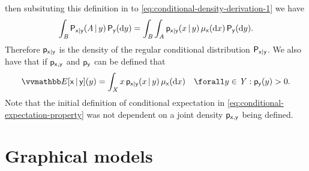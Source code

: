 then subsituting this definition in to \eqref{eq:conditional-density-derivation-1} we have
\begin{equation}\label{eq:conditional-density-derivation-2}
  \int_{\mathit{B}} \mathsf{P}_{\mathsf{x}|\mathsf{y}}(\mathit{A}\operatorname{|} y) \,\mathsf{P}_{\mathsf{y}}(\mathrm{d} y)
  =
  \int_{\mathit{B}}\int_{\mathit{A}} 
    \mathsf{p}_{\mathsf{x}|\mathsf{y}}(x\operatorname{|} y)
  \,\mu_{\mathsf{x}}(\mathrm{d} x)\,\mathsf{P}_{\mathsf{y}}(\mathrm{d} y).
\end{equation}
Therefore $\mathsf{p}_{\mathsf{x}|\mathsf{y}}$ is the density of the regular conditional distribution $\mathsf{P}_{\mathsf{x}|\mathsf{y}}$. We also have that if $\mathsf{p}_{\mathsf{x},\mathsf{y}}$ and $\mathsf{p}_{\mathsf{y}}$ can be defined that 
\begin{equation}\label{eq:conditional-expectation-density}
  \expc{\rvar{x}\gvn\rvar{y}}(y) =
  \int_{\set{X}} x\,\pden{\rvar{x}|\rvar{y}}(x\gvn y) \,\mu_{\rvar{x}}(\dr x)
  \quad \forall y \in \set{Y} : \pden{\rvar{y}}(y) > 0.
\end{equation}
Note that the initial definition of conditional expectation in \eqref{eq:conditional-expectation-property} was not dependent on a joint density $\mathsf{p}_{\mathsf{x},\mathsf{y}}$ being defined. %


\section{Graphical models}\label{sec:graphical-models}

